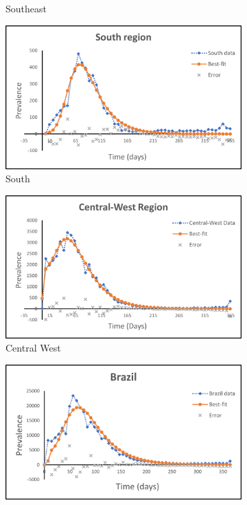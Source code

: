 \documentclass[10pt,letterpaper]{article}
\begin{document}
\begin{figure}
\begin{subfigure}[b]{0.3\textwidth}
         \caption{Southeast}
         \label{fig:SE_PE}
     \end{subfigure}
      \hfill
     \begin{subfigure}[b]{0.3\textwidth}
         \centering
         \includegraphics[width=\textwidth]{Zika_PE_figs/S.png}
         \caption{South}
         \label{fig:south_PE}
     \end{subfigure}
      \hfill
     \begin{subfigure}[b]{0.3\textwidth}
         \centering
         \includegraphics[width=\textwidth]{Zika_PE_figs/CW.png}
         \caption{Central West}
         \label{fig:CW_PE}
     \end{subfigure}
      \hfill
     \begin{subfigure}[b]{0.3\textwidth}
         \centering
         \includegraphics[width=\textwidth]{Zika_PE_figs/B.png}

\end{subfigure}
\end{figure}
\end{document}
